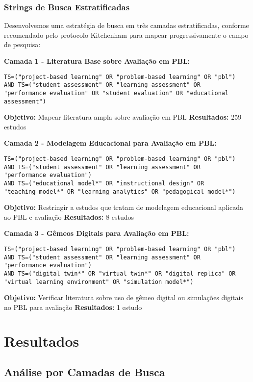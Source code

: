 \documentclass[english, spanish, brazilian]{RBIEarticle} %
\begin{document}
\subsubsection{Strings de Busca Estratificadas}

Desenvolvemos uma estratégia de busca em três camadas estratificadas, conforme recomendado pelo protocolo Kitchenham para mapear progressivamente o campo de pesquisa:

\textbf{Camada 1 - Literatura Base sobre Avaliação em PBL:}
\begin{verbatim}
TS=("project-based learning" OR "problem-based learning" OR "pbl")
AND TS=("student assessment" OR "learning assessment" OR
"performance evaluation" OR "student evaluation" OR "educational assessment")
\end{verbatim}
\textbf{Objetivo:} Mapear literatura ampla sobre avaliação em PBL
\textbf{Resultados:} 259 estudos

\textbf{Camada 2 - Modelagem Educacional para Avaliação em PBL:}
\begin{verbatim}
TS=("project-based learning" OR "problem-based learning" OR "pbl")
AND TS=("student assessment" OR "learning assessment" OR
"performance evaluation")
AND TS=("educational model*" OR "instructional design" OR
"teaching model*" OR "learning analytics" OR "pedagogical model*")
\end{verbatim}
\textbf{Objetivo:} Restringir a estudos que tratam de modelagem educacional aplicada ao PBL e avaliação
\textbf{Resultados:} 8 estudos

\textbf{Camada 3 - Gêmeos Digitais para Avaliação em PBL:}
\begin{verbatim}
TS=("project-based learning" OR "problem-based learning" OR "pbl")
AND TS=("student assessment" OR "learning assessment" OR
"performance evaluation")
AND TS=("digital twin*" OR "virtual twin*" OR "digital replica" OR
"virtual learning environment" OR "simulation model*")
\end{verbatim}
\textbf{Objetivo:} Verificar literatura sobre uso de gêmeo digital ou simulações digitais no PBL para avaliação
\textbf{Resultados:} 1 estudo

\section{Resultados}

\subsection{Análise por Camadas de Busca}
\end{document}
